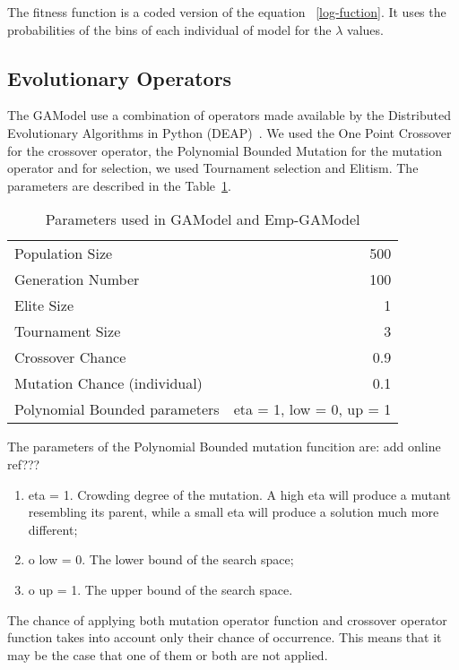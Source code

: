 The fitness function is a coded version of the equation ~\ref{log-fuction}. It uses the probabilities of the bins of each individual of model for the $\lambda$ values.\\

\subsection{Evolutionary Operators}\label{EvoGA}
The GAModel use a combination of operators made available by the Distributed Evolutionary Algorithms in Python (DEAP)~\cite{DeRainville:2012:DPF:2330784.2330799}. We used the One Point Crossover for the crossover operator, the Polynomial Bounded Mutation for the mutation operator and for selection, we used Tournament selection and Elitism. The parameters are described in the Table~\ref{GAParameters}.

\begin{table}[!ht]
  \caption{Parameters used in GAModel and Emp-GAModel}
  \label{GAParameters}
  \begin{center}
  \begin{tabular}{|l|r|}
    \hline
    Population Size & 500\\
    Generation Number & 100\\
    Elite Size & 1\\
    Tournament Size & 3\\
    Crossover Chance & 0.9\\
    Mutation Chance (individual) & 0.1\\
	Polynomial Bounded parameters & eta = 1, low = 0, up = 1\\
    \hline    
  \end{tabular}
  \end{center}
\end{table}

The parameters of the Polynomial Bounded mutation funcition are: add online ref???
\begin{enumerate}
\item eta = 1. Crowding degree of the mutation. A high eta will produce a mutant resembling its parent, while a small eta will produce a solution much more different;
\item o low = 0. The lower bound of the search space;
\item o up = 1. The upper bound of the search space.
\end{enumerate}

The chance of applying both mutation operator function and crossover operator function takes into account only their chance of occurrence. This means that it may be the case that one of them or both are not applied.\\

